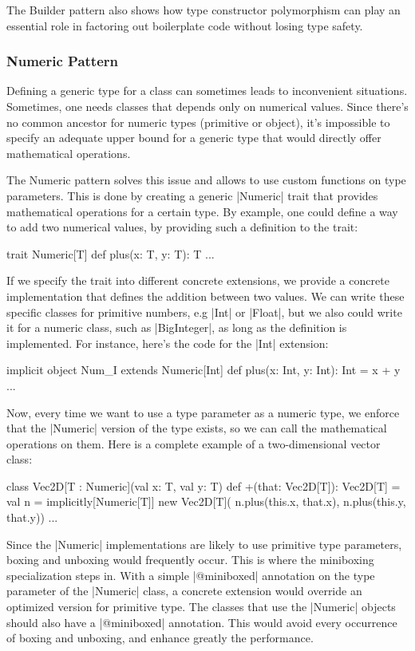 The Builder pattern also shows how type constructor polymorphism can play an essential role in factoring out boilerplate code without losing type safety.\cite{adriaan}

\subsubsection{Numeric Pattern}

Defining a generic type for a class can sometimes leads to inconvenient situations. Sometimes, one needs classes that depends only on numerical values. Since there's no common ancestor for numeric types (primitive or object), it's impossible to specify an adequate upper bound for a generic type that would directly offer mathematical operations.

The Numeric pattern solves this issue and allows to use custom functions on type parameters. This is done by creating a generic |Numeric| trait that provides mathematical operations for a certain type. By example, one could define a way to add two numerical values, by providing such a definition to the trait:

\begin{lstlisting-nobreak}
 trait Numeric[T] {
   def plus(x: T, y: T): T
   ...
 }
\end{lstlisting-nobreak}

If we specify the trait into different concrete extensions, we provide a concrete implementation that defines the addition between two values. We can write these specific classes for primitive numbers, e.g |Int| or |Float|, but we also could write it for a numeric class, such as |BigInteger|, as long as the definition is implemented. For instance, here's the code for the |Int| extension:

\begin{lstlisting-nobreak}
 implicit object Num_I extends Numeric[Int] {
   def plus(x: Int, y: Int): Int = x + y
   ...
 }
\end{lstlisting-nobreak}

Now, every time we want to use a type parameter as a numeric type, we enforce that the |Numeric| version of the type exists, so we can call the mathematical operations on them. Here is a complete example of a two-dimensional vector class:

\begin{lstlisting-nobreak}
 class Vec2D[T : Numeric](val x: T, val y: T) {
   def +(that: Vec2D[T]): Vec2D[T] = {
     val n = implicitly[Numeric[T]]
     new Vec2D[T](
       n.plus(this.x, that.x),
       n.plus(this.y, that.y))
   }
   ...
 }
\end{lstlisting-nobreak}

Since the |Numeric| implementations are likely to use primitive type parameters, boxing and unboxing would frequently occur. This is where the miniboxing specialization steps in. With a simple |@miniboxed| annotation on the type parameter of the |Numeric| class, a concrete extension would override an optimized version for primitive type. The classes that use the |Numeric| objects should also have a |@miniboxed| annotation. This would avoid every occurrence of boxing and unboxing, and enhance greatly the performance.